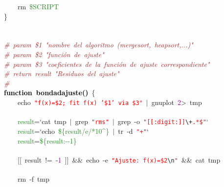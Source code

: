 \mbox{}\ \ \ \ rm\ \textcolor{ForestGreen}{\$SCRIPT} \\
\mbox{}\} \\
\mbox{} \\
\mbox{} \\
\mbox{}\textit{\textcolor{Brown}{\#\ param\ \$1\ "{}nombre\ del\ algoritmo\ (mergesort,\ heapsort,...)"{}}} \\
\mbox{}\textit{\textcolor{Brown}{\#\ param\ \$2\ "{}función\ de\ ajuste"{}}} \\
\mbox{}\textit{\textcolor{Brown}{\#\ param\ \$3\ "{}coeficientes\ de\ la\ función\ de\ ajuste\ correspondiente"{}}} \\
\mbox{}\textit{\textcolor{Brown}{\#\ return\ result\ "{}Residuos\ del\ ajuste"{}}} \\
\mbox{}\textit{\textcolor{Brown}{\#}} \\
\mbox{}\textbf{\textcolor{Black}{function\ bondadajuste()}}\ \{ \\
\mbox{}\ \ \ \ echo\ \texttt{\textcolor{Red}{"{}f(x)=\$2;\ fit\ f(x)\ '\$1'\ via\ \$3"{}}}\ \textcolor{BrickRed}{$|$}\ gnuplot\ \textcolor{Purple}{2}\textcolor{BrickRed}{\textgreater{}}\ tmp \\
\mbox{}\ \ \ \  \\
\mbox{}\ \ \ \ \textcolor{ForestGreen}{result}\textcolor{BrickRed}{=}`cat\ tmp\ \textcolor{BrickRed}{$|$}\ grep\ \texttt{\textcolor{Red}{"{}rms"{}}}\ \textcolor{BrickRed}{$|$}\ grep\ -o\ \texttt{\textcolor{Red}{"{}[[:digit:]]}}\texttt{\textcolor{CarnationPink}{\textbackslash{}+}}\texttt{\textcolor{Red}{.*\$"{}}}` \\
\mbox{}\ \ \ \ \textcolor{ForestGreen}{result}\textcolor{BrickRed}{=}`echo\ \textcolor{ForestGreen}{\$\{result/e/*10\textasciicircum{}\}}\ \textcolor{BrickRed}{$|$}\ tr\ -d\ \texttt{\textcolor{Red}{"{}+"{}}}`\  \\
\mbox{}\ \ \ \ \textcolor{ForestGreen}{result}\textcolor{BrickRed}{=}\textcolor{ForestGreen}{\$\{result:-\/-1\}} \\
\mbox{}\ \ \ \  \\
\mbox{}\ \ \ \ \textcolor{BrickRed}{[[}\ result\ \textcolor{BrickRed}{!=}\ -\textcolor{Purple}{1}\ \textcolor{BrickRed}{]]}\ \textcolor{BrickRed}{\&\&}\ echo\ -e\ \texttt{\textcolor{Red}{"{}Ajuste:\ f(x)=\$2}}\texttt{\textcolor{CarnationPink}{\textbackslash{}n}}\texttt{\textcolor{Red}{"{}}}\ \textcolor{BrickRed}{\&\&}\ cat\ tmp \\
\mbox{}\ \ \ \  \\
\mbox{}\ \ \ \ rm\ -f\ tmp \\
